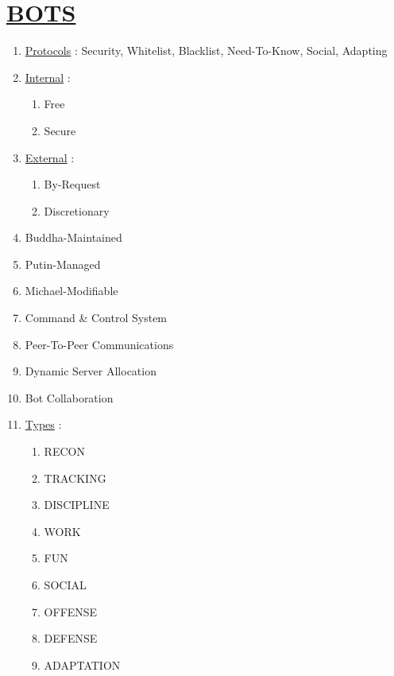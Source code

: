 \documentclass[11pt]{article}
\begin{document}
\section*{\ul{BOTS}}
\begin{enumerate}
	\item[] \ul{Protocols} : Security, Whitelist, Blacklist, Need-To-Know, Social, Adapting

	\item[] \ul{Internal}  :
	\begin{enumerate}
		\item[] Free
		\item[] Secure
	\end{enumerate}
	
	\item[] \ul{External} :
	\begin{enumerate}
		\item[] By-Request
		\item[] Discretionary
	\end{enumerate}

	\item[] Buddha-Maintained
	\item[] Putin-Managed
	\item[] Michael-Modifiable
	\item[] Command \& Control System
	\item[] Peer-To-Peer Communications
	\item[] Dynamic Server Allocation
	\item[] Bot Collaboration

	\item[] \ul{Types} :
	\begin{enumerate}
		\item[] RECON
		
		\item[] TRACKING

		\item[] DISCIPLINE
		
		\item[] WORK
		
		\item[] FUN
		
		\item[] SOCIAL
		
		\item[] OFFENSE
		
		\item[] DEFENSE
		
		\item[] ADAPTATION
	\end{enumerate}

\end{enumerate}
\end{document}
